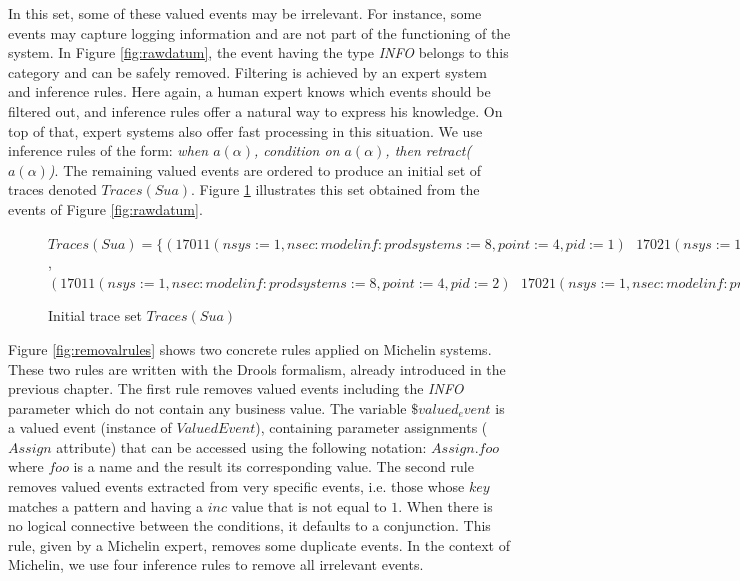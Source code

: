In this set, some of these valued events may be irrelevant.  For
instance, some events may capture logging information and are not
part of the functioning of the system. In Figure
\ref{fig:rawdatum}, the event having the type \textit{INFO}
belongs to this category and can be safely removed. Filtering is
achieved by an expert system and inference rules. Here again, a
human expert knows which events should be filtered out, and
inference rules offer a natural way to express his knowledge. On
top of that, expert systems also offer fast processing in this
situation. We use inference rules of the form: \textit{when
$a(\alpha)$, condition on $a(\alpha)$, then
retract($a(\alpha)$)}.
The remaining valued events are ordered to produce an initial set
of traces denoted $Traces(Sua)$. Figure \ref{fig:tsua}
illustrates this set obtained from the events of Figure
\ref{fig:rawdatum}.

\begin{figure}[ht]
\begin{framed}
    $Traces(Sua) = \{
    (17011(nsys:=1,nsec:modelinf:prodsystems:=8,point:=4,pid:=1)\text{ }
    17021(nsys:=1,nsec:modelinf:prodsystems:=8,point:=4,tpoint:=8,pid:=1))$,
    $(17011(nsys:=1,nsec:modelinf:prodsystems:=8,point:=4,pid:=2)\text{ }
    17021(nsys:=1,nsec:modelinf:prodsystems:=8,point:=4,tpoint:=8,pid:=2)) \}$
\end{framed}

\caption{Initial trace set $Traces(Sua)$}
\label{fig:tsua}
\end{figure}

Figure \ref{fig:removalrules} shows two concrete rules applied on
Michelin systems. These two rules are written with the Drools
formalism, already introduced in the previous chapter. The first
rule removes valued events including the \textit{INFO} parameter
which do not contain any business value. The variable
$\$valued_event$ is a valued event (instance of $ValuedEvent$),
containing parameter assignments ($Assign$ attribute) that can be
accessed using the following notation: $Assign.foo$ where $foo$
is a name and the result its corresponding value.  The second
rule removes valued events extracted from very specific events,
i.e. those whose $key$ matches a pattern and having a $inc$ value
that is not equal to $1$. When there is no logical connective
between the conditions, it defaults to a conjunction. This rule,
given by a Michelin expert, removes some duplicate events. In the
context of Michelin, we use four inference rules to remove all
irrelevant events.

